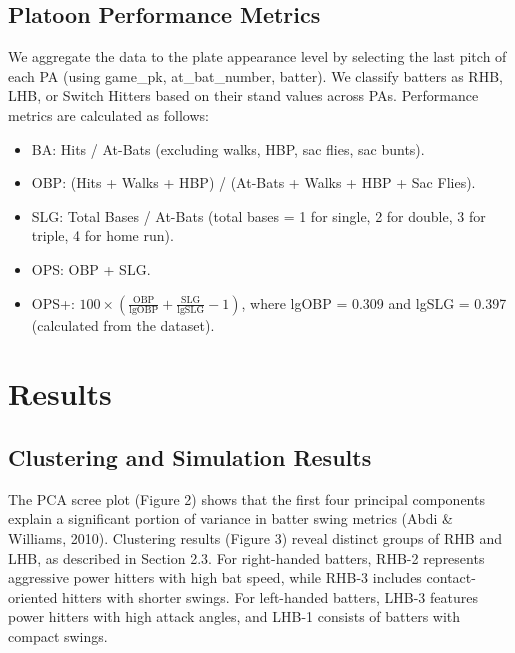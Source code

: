 \documentclass[
]{article}
\providecommand{\tightlist}{%
  \setlength{\itemsep}{0pt}\setlength{\parskip}{0pt}}
\begin{document}
\hypertarget{platoon-performance-metrics}{%
\subsection{Platoon Performance
Metrics}\label{platoon-performance-metrics}}

We aggregate the data to the plate appearance level by selecting the
last pitch of each PA (using game\_pk, at\_bat\_number, batter). We
classify batters as RHB, LHB, or Switch Hitters based on their stand
values across PAs. Performance metrics are calculated as follows:

\begin{itemize}
\tightlist
\item
  BA: Hits / At-Bats (excluding walks, HBP, sac flies, sac bunts).
\item
  OBP: (Hits + Walks + HBP) / (At-Bats + Walks + HBP + Sac Flies).
\item
  SLG: Total Bases / At-Bats (total bases = 1 for single, 2 for double,
  3 for triple, 4 for home run).
\item
  OPS: OBP + SLG.
\item
  OPS+:
  \(100 \times \left( \frac{\text{OBP}}{\text{lgOBP}} + \frac{\text{SLG}}{\text{lgSLG}} - 1 \right)\),
  where lgOBP = 0.309 and lgSLG = 0.397 (calculated from the dataset).
\end{itemize}

\hypertarget{results}{%
\section{Results}\label{results}}

\hypertarget{clustering-and-simulation-results}{%
\subsection{Clustering and Simulation
Results}\label{clustering-and-simulation-results}}

The PCA scree plot (Figure 2) shows that the first four principal
components explain a significant portion of variance in batter swing
metrics (Abdi \& Williams, 2010). Clustering results (Figure 3) reveal
distinct groups of RHB and LHB, as described in Section 2.3. For
right-handed batters, RHB-2 represents aggressive power hitters with
high bat speed, while RHB-3 includes contact-oriented hitters with
shorter swings. For left-handed batters, LHB-3 features power hitters
with high attack angles, and LHB-1 consists of batters with compact
swings.
\end{document}

